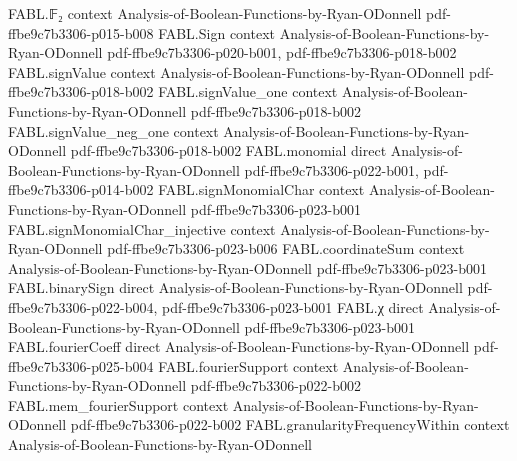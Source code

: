 \begin{theorem}
\label{FABL.isPivotal_tribes_iff}
\leanok
{}
\proofstep
  {FABL.𝔽₂}
  {context}
  {Analysis-of-Boolean-Functions-by-Ryan-ODonnell}
  {pdf-ffbe9c7b3306-p015-b008}
\proofstep
  {FABL.Sign}
  {context}
  {Analysis-of-Boolean-Functions-by-Ryan-ODonnell}
  {pdf-ffbe9c7b3306-p020-b001,
    pdf-ffbe9c7b3306-p018-b002}
\proofstep
  {FABL.signValue}
  {context}
  {Analysis-of-Boolean-Functions-by-Ryan-ODonnell}
  {pdf-ffbe9c7b3306-p018-b002}
\proofstep
  {FABL.signValue_one}
  {context}
  {Analysis-of-Boolean-Functions-by-Ryan-ODonnell}
  {pdf-ffbe9c7b3306-p018-b002}
\proofstep
  {FABL.signValue_neg_one}
  {context}
  {Analysis-of-Boolean-Functions-by-Ryan-ODonnell}
  {pdf-ffbe9c7b3306-p018-b002}
\proofstep
  {FABL.monomial}
  {direct}
  {Analysis-of-Boolean-Functions-by-Ryan-ODonnell}
  {pdf-ffbe9c7b3306-p022-b001,
    pdf-ffbe9c7b3306-p014-b002}
\proofstep
  {FABL.signMonomialChar}
  {context}
  {Analysis-of-Boolean-Functions-by-Ryan-ODonnell}
  {pdf-ffbe9c7b3306-p023-b001}
\proofstep
  {FABL.signMonomialChar_injective}
  {context}
  {Analysis-of-Boolean-Functions-by-Ryan-ODonnell}
  {pdf-ffbe9c7b3306-p023-b006}
\proofstep
  {FABL.coordinateSum}
  {context}
  {Analysis-of-Boolean-Functions-by-Ryan-ODonnell}
  {pdf-ffbe9c7b3306-p023-b001}
\proofstep
  {FABL.binarySign}
  {direct}
  {Analysis-of-Boolean-Functions-by-Ryan-ODonnell}
  {pdf-ffbe9c7b3306-p022-b004,
    pdf-ffbe9c7b3306-p023-b001}
\proofstep
  {FABL.χ}
  {direct}
  {Analysis-of-Boolean-Functions-by-Ryan-ODonnell}
  {pdf-ffbe9c7b3306-p023-b001}
\proofstep
  {FABL.fourierCoeff}
  {direct}
  {Analysis-of-Boolean-Functions-by-Ryan-ODonnell}
  {pdf-ffbe9c7b3306-p025-b004}
\proofstep
  {FABL.fourierSupport}
  {context}
  {Analysis-of-Boolean-Functions-by-Ryan-ODonnell}
  {pdf-ffbe9c7b3306-p022-b002}
\proofstep
  {FABL.mem_fourierSupport}
  {context}
  {Analysis-of-Boolean-Functions-by-Ryan-ODonnell}
  {pdf-ffbe9c7b3306-p022-b002}
\proofstep
  {FABL.granularityFrequencyWithin}
  {context}
  {Analysis-of-Boolean-Functions-by-Ryan-ODonnell}

\end{theorem}
